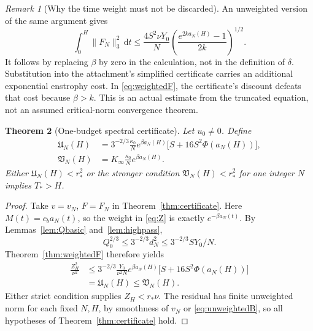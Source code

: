 \documentclass[11pt,a4paper]{article}
\newtheorem{theorem}{Theorem}[section]
\theoremstyle{definition}\newtheorem{definition}[theorem]{Definition}
\theoremstyle{remark}\newtheorem{remark}[theorem]{Remark}
\newcommand{\dd}{\,\mathrm d}
\newcommand{\norm}[1]{\lVert #1\rVert}
\newcommand{\rstar}{r_*}
\newcommand{\kin}{\kappa_0}
\newcommand{\Kinf}{K_\infty}
\numberwithin{equation}{section}
\begin{document}
\begin{remark}[Why the time weight must not be discarded]
An unweighted version of the same argument gives
\begin{equation}\label{eq:unweightedB}
 \int_0^H\norm{F_N}_3^2\dd t
 \le\frac{4S^2\nu Y_0}{N}
 \left(\frac{e^{2ka_N(H)}-1}{2k}\right)^{1/2}.
\end{equation}
It follows by replacing $\beta$ by zero in the calculation, not in the definition of $\delta$. Substitution into the attachment's simplified certificate carries an additional exponential enstrophy cost. In \eqref{eq:weightedF}, the certificate's discount defeats that cost because $\beta>k$. This is an actual estimate from the truncated equation, not an assumed critical-norm convergence theorem.
\end{remark}

\begin{theorem}[One-budget spectral certificate]\label{thm:onebudget}
Let $u_0\ne0$. Define
\begin{align}
 \mathfrak U_N(H)
 &=3^{-2/3}\frac{\kin}{N}e^{\beta a_N(H)}
       \bigl[S+16S^2\Phi(a_N(H))\bigr],\label{eq:UN}\\
 \mathfrak V_N(H)
 &=\Kinf\frac{\kin}{N}e^{\beta a_N(H)}.\label{eq:VN}
\end{align}
Either $\mathfrak U_N(H)<\rstar^2$ or the stronger condition $\mathfrak V_N(H)<\rstar^2$ for one integer $N$ implies $T_*>H$.
\end{theorem}
\begin{proof}
Take $v=v_N$, $F=F_N$ in Theorem~\ref{thm:certificate}. Here $M(t)=c_ba_N(t)$, so the weight in \eqref{eq:Z} is exactly $e^{-\beta a_N(t)}$. By Lemmas~\ref{lem:Qbasic} and~\ref{lem:highpass},
\[
 Q_0^{2/3}\le3^{-2/3}d_N^2\le3^{-2/3}S Y_0/N.
\]
Theorem~\ref{thm:weightedF} therefore yields
\begin{align*}
 \frac{Z_H^2}{\nu^2}
 &\le3^{-2/3}\frac{Y_0}{\nu^2N}e^{\beta a_N(H)}
       \bigl[S+16S^2\Phi(a_N(H))\bigr]\\
 &=\mathfrak U_N(H)\le\mathfrak V_N(H).
\end{align*}
Either strict condition supplies $Z_H<\rstar\nu$. The residual has finite unweighted norm for each fixed $N,H$, by smoothness of $v_N$ or \eqref{eq:unweightedB}, so all hypotheses of Theorem~\ref{thm:certificate} hold.
\end{proof}
\end{document}
